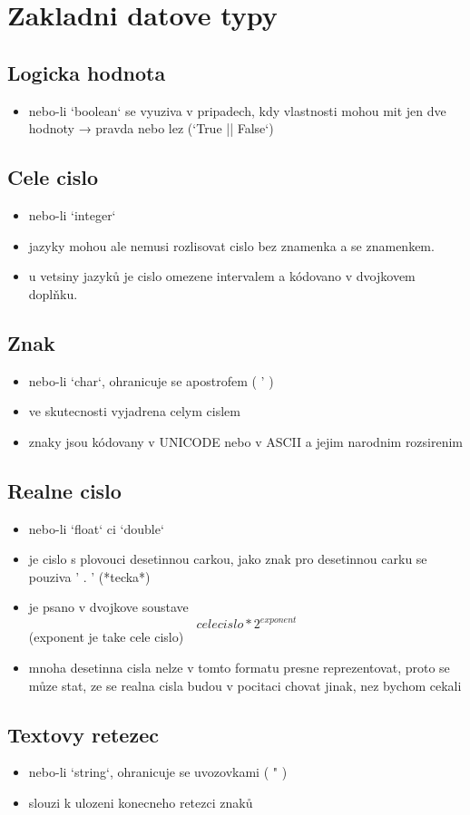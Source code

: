 \documentclass[a4paper,12pt]{article}
\begin{document}
\section{Zakladni datove typy}
    \subsection{Logicka hodnota}
        \begin{itemize}
            \item{nebo-li `boolean` se vyuziva v pripadech, kdy vlastnosti mohou mit jen dve hodnoty → pravda nebo lez (`True || False`)}
        \end{itemize}
    \subsection{Cele cislo}
        \begin{itemize}
            \item{nebo-li `integer`}
            \item{jazyky mohou ale nemusi rozlisovat cislo bez znamenka a se znamenkem.}
            \item{u vetsiny jazyků je cislo omezene intervalem a kódovano v dvojkovem doplňku.}
        \end{itemize}
    \subsection{Znak}
        \begin{itemize}
            \item{nebo-li `char`, ohranicuje se apostrofem ( ' )}
            \item{ve skutecnosti vyjadrena celym cislem}
            \item{znaky jsou kódovany v UNICODE nebo v ASCII a jejim narodnim rozsirenim}
        \end{itemize}
    \subsection{Realne cislo}
        \begin{itemize}
            \item{nebo-li `float` ci `double`}
            \item{je cislo s plovouci desetinnou carkou, jako znak pro desetinnou carku se pouziva ' . ' (*tecka*)}
            \item{je psano v dvojkove soustave $$ {celecislo} * 2^{exponent}$$ (exponent je take cele cislo)}
            \item{mnoha desetinna cisla nelze v tomto formatu presne reprezentovat, proto se můze stat, ze se realna cisla budou v pocitaci chovat jinak, nez bychom cekali}
        \end{itemize}
    \subsection{Textovy retezec}
        \begin{itemize}
            \item{nebo-li `string`, ohranicuje se uvozovkami ( " )}
            \item{slouzi k ulozeni konecneho retezci znaků}
        \end{itemize}
\end{document}
